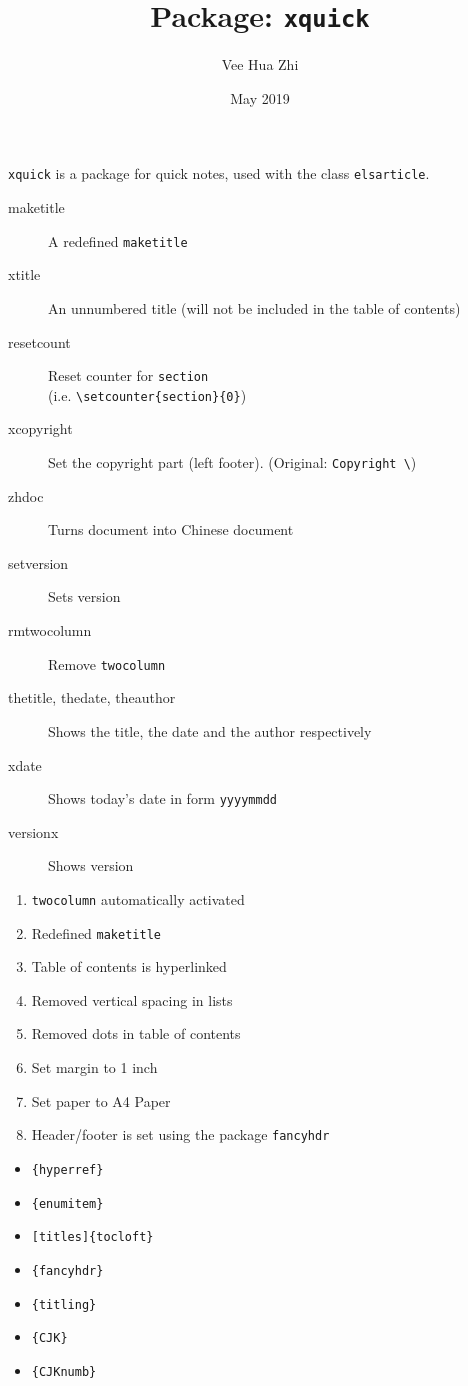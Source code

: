 \documentclass{elsarticle}
\title{Package: \texttt{xquick}}
\author{Vee Hua Zhi}
\date{May 2019}
\begin{document}
\maketitle
{}
\texttt{xquick} is a package for quick notes, used with the class \texttt{elsarticle}. 


\begin{description}
    \item [maketitle] A redefined \texttt{maketitle}
    \item [xtitle] An unnumbered title (will not be included in the table of contents)
    \item [resetcount] Reset counter for \texttt{section} \\(i.e. \verb!\setcounter{section}{0}!)
    \item [xcopyright] Set the copyright part (left footer). (Original: \verb!Copyright \!)
    \item [zhdoc] Turns document into Chinese document
    \item [setversion] Sets version
    \item [rmtwocolumn] Remove \texttt{twocolumn}
\end{description}

\begin{description}
    \item [thetitle, thedate, theauthor] Shows the title, the date and the author respectively
    \item [xdate] Shows today's date in form \texttt{yyyymmdd}
    \item [versionx] Shows version
\end{description}

\begin{enumerate}
    \item \texttt{twocolumn} automatically activated
    \item Redefined \texttt{maketitle}
    \item Table of contents is hyperlinked
    \item Removed vertical spacing in lists
    \item Removed dots in table of contents
    \item Set margin to 1 inch
    \item Set paper to A4 Paper
    \item Header/footer is set using the package \texttt{fancyhdr}
\end{enumerate}

\begin{itemize}
    \item \texttt{\{hyperref\}}
    \item \texttt{\{enumitem\}}
    \item \texttt{{[titles]}\{tocloft\}}
    \item \texttt{\{fancyhdr\}}
    \item \texttt{\{titling\}}
    \item \texttt{\{CJK\}}
    \item \texttt{\{CJKnumb\}}
\end{itemize}
\end{document}
